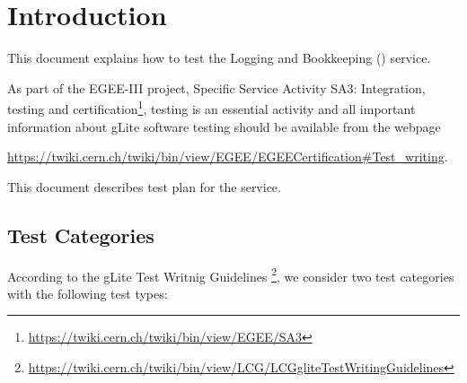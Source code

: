 \section{Introduction}

This document explains how to test the Logging and Bookkeeping (\LB) service. 

As part of the EGEE-III project, Specific Service Activity SA3: Integration,
testing and certification\footnote{\url{https://twiki.cern.ch/twiki/bin/view/EGEE/SA3}}, 
testing is an essential activity and all important information about gLite software 
testing should be available from the webpage

\begin{center}
\url{https://twiki.cern.ch/twiki/bin/view/EGEE/EGEECertification#Test_writing}.
\end{center}

This document describes test plan for the \LB service.


\subsection{Test Categories}

%

According to the gLite Test Writnig Guidelines
\footnote{\url{https://twiki.cern.ch/twiki/bin/view/LCG/LCGgliteTestWritingGuidelines}},
we consider two test categories with the following test types:

